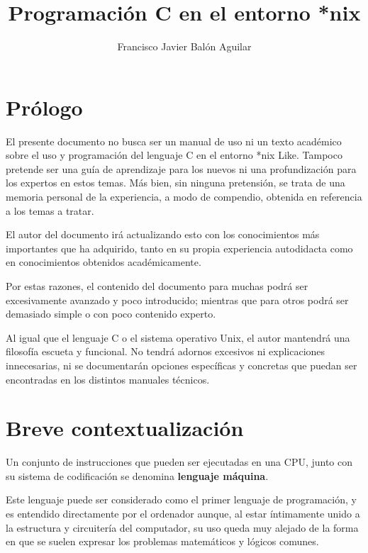 \documentclass[a4paper, 11pt, titlepage]{article}
\title{Programación C en el entorno *nix}
\author{Francisco Javier Balón Aguilar}
\begin{document}
\maketitle
\renewcommand{\contentsname}{Índice}
\tableofcontents
\newpage

\section*{Prólogo}

    El presente documento no busca ser un manual de uso ni un texto académico sobre el 
    uso y programación del lenguaje C en el entorno *nix Like. Tampoco pretende ser una 
    guía de aprendizaje para los nuevos ni una profundización para los expertos en estos 
    temas. Más bien, sin ninguna pretensión, se trata de una memoria personal de la 
    experiencia, a modo de compendio, obtenida en referencia a los temas a tratar.

    El autor del documento irá actualizando esto con los conocimientos más importantes
    que ha adquirido, tanto en su propia experiencia autodidacta como en conocimientos 
    obtenidos académicamente.

    Por estas razones, el contenido del documento para muchas podrá ser excesivamente 
    avanzado y poco introducido; mientras que para otros podrá ser demasiado simple o 
    con poco contenido experto.

    Al igual que el lenguaje C o el sistema operativo Unix, el autor mantendrá una 
    filosofía escueta y funcional. No tendrá adornos excesivos ni explicaciones 
    innecesarias, ni se documentarán opciones específicas y concretas que puedan ser 
    encontradas en los distintos manuales técnicos.

    \newpage

\section{Breve contextualización}

    Un conjunto de instrucciones que pueden ser ejecutadas en una CPU, junto con su 
    sistema de codificación se denomina \textbf{lenguaje máquina}.

    Este lenguaje puede ser considerado como el primer lenguaje de programación, y 
    es entendido directamente por el ordenador aunque, al estar íntimamente 
    unido a la estructura y circuitería del computador, su uso queda muy alejado de 
    la forma en que se suelen expresar los problemas matemáticos y lógicos comunes.
\end{document}

